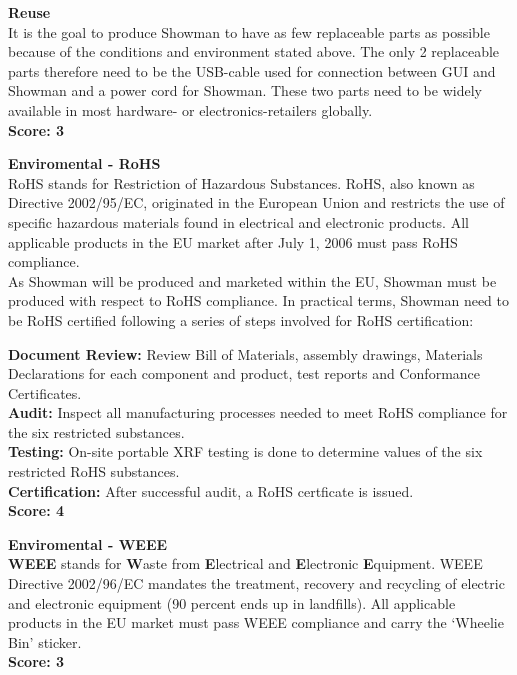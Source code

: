 \textbf{Reuse} \\
It is the goal to produce Showman to have as few replaceable parts as possible because of the conditions and environment stated above. The only 2 replaceable parts therefore need to be the USB-cable used for connection between GUI and Showman and a power cord for Showman. These two parts need to be widely available in most hardware- or electronics-retailers globally. \\
\textbf{Score: 3} \newline

\textbf{Enviromental - RoHS} \\
RoHS stands for Restriction of Hazardous Substances. RoHS, also known as Directive 2002/95/EC, originated in the European Union and restricts the use of specific hazardous materials found in electrical and electronic products. All applicable products in the EU market after July 1, 2006 must pass RoHS compliance. \\
As Showman will be produced and marketed within the EU, Showman must be produced with respect to RoHS compliance. In practical terms, Showman need to be RoHS certified following a series of steps involved for RoHS certification: \newline

\textbf{Document Review:} Review Bill of Materials, assembly drawings, Materials Declarations for each component and product, test reports and Conformance Certificates. \\

\textbf{Audit:} Inspect all manufacturing processes needed to meet RoHS compliance for the six restricted substances. \\

\textbf{Testing:} On-site portable XRF testing is done to determine values of the six restricted RoHS substances. \\

\textbf{Certification:} After successful audit, a RoHS certficate is issued. \\
\textbf{Score: 4} \newline

\textbf{Enviromental - WEEE} \\
\textbf{WEEE} stands for \textbf{W}aste from \textbf{E}lectrical and \textbf{E}lectronic \textbf{E}quipment. WEEE Directive 2002/96/EC mandates the treatment, recovery and recycling of electric and electronic equipment (90 percent ends up in landfills). All applicable products in the EU market must pass WEEE compliance and carry the `Wheelie Bin' sticker. \\
\textbf{Score: 3} \newline

